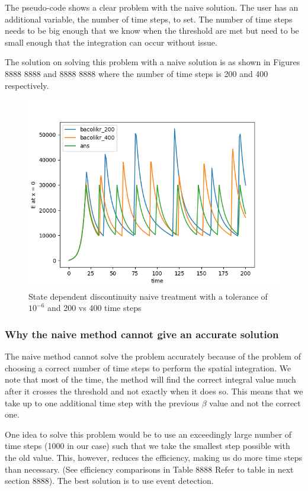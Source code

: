 \documentclass{article}
\begin{document}
The pseudo-code shows a clear problem with the naive solution. The user has an additional variable, the number of time steps, to set. The number of time steps needs to be big enough that we know when the threshold are met but need to be small enough that the integration can occur without issue. 

The solution on solving this problem with a naive solution is as shown in Figures 8888 8888 and 8888 8888 where the number of time steps is 200 and 400 respectively. 

\begin{figure}[H]
\centering
\includegraphics[width=0.7\linewidth]{./figures/pde_state_disc_naive_200vs400}
\caption{State dependent discontinuity naive treatment with a tolerance of $10^{-6}$ and 200 vs 400 time steps}
\label{fig:pde_state_disc_naive_200vs400}
\end{figure}

\subsubsection{Why the naive method cannot give an accurate solution}
\label{subsubsection:pde_state_naive_always_inaccurate}
The naive method cannot solve the problem accurately because of the problem of choosing a correct number of time steps to perform the spatial integration. We note that most of the time, the method will find the correct integral value much after it crosses the threshold and not exactly when it does so. This means that we take up to one additional time step with the previous $\beta$ value and not the correct one.

One idea to solve this problem would be to use an exceedingly large number of time steps (1000 in our case) such that we take the smallest step possible with the old value. This, however, reduces the efficiency, making us do more time steps than necessary. (See efficiency comparisons in Table 8888 Refer to table in next section 8888). The best solution is to use event detection.
\end{document}
